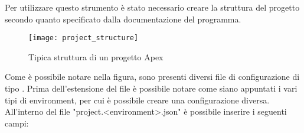 Per utilizzare questo strumento è stato necessario creare la struttura del
progetto secondo quanto specificato dalla documentazione del programma.

\begin{figure}[H]
  \centering
  \texttt{[image: project\_structure]}
  \caption{Tipica struttura di un progetto Apex}
\end{figure}

Come è possibile notare nella figura, sono presenti diversi file di
configurazione di tipo . Prima
dell'estensione del file è possibile notare come siano appuntati i vari tipi di
environment, per cui è possibile creare una configurazione diversa.
All'interno del file "project.<environment>.json" è possibile inserire i
seguenti campi:
